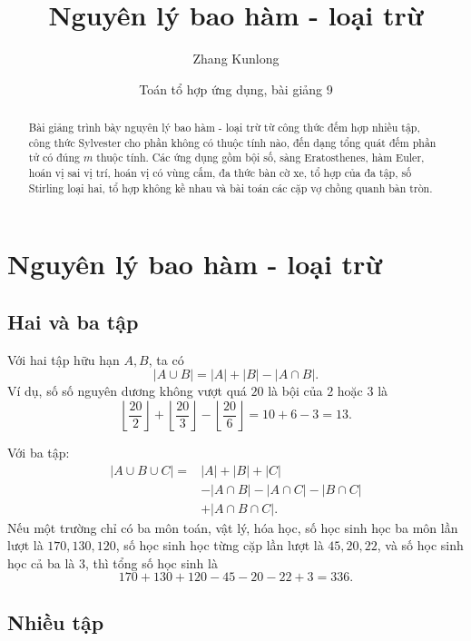 \documentclass[11pt]{article}
\title{Nguyên lý bao hàm - loại trừ}
\author{Zhang Kunlong}
\date{Toán tổ hợp ứng dụng, bài giảng 9}
\newcommand{\card}[1]{\left|#1\right|}
\begin{document}
\maketitle


\begin{abstract}
Bài giảng trình bày nguyên lý bao hàm - loại trừ từ công thức đếm hợp nhiều
tập, công thức Sylvester cho phần không có thuộc tính nào, đến dạng tổng quát
đếm phần tử có đúng \(m\) thuộc tính. Các ứng dụng gồm bội số, sàng
Eratosthenes, hàm Euler, hoán vị sai vị trí, hoán vị có vùng cấm, đa thức bàn
cờ xe, tổ hợp của đa tập, số Stirling loại hai, tổ hợp không kề nhau và bài
toán các cặp vợ chồng quanh bàn tròn.
\end{abstract}

\tableofcontents

\section{Nguyên lý bao hàm - loại trừ}

\subsection{Hai và ba tập}

Với hai tập hữu hạn \(A,B\), ta có
\[
  \card{A\cup B}=\card A+\card B-\card{A\cap B}.
\]
Ví dụ, số số nguyên dương không vượt quá \(20\) là bội của \(2\) hoặc \(3\)
là
\[
  \left\lfloor\frac{20}{2}\right\rfloor+
  \left\lfloor\frac{20}{3}\right\rfloor-
  \left\lfloor\frac{20}{6}\right\rfloor=10+6-3=13.
\]

Với ba tập:
\[
\begin{aligned}
  \card{A\cup B\cup C}
  ={}&\card A+\card B+\card C\\
  &-\card{A\cap B}-\card{A\cap C}-\card{B\cap C}\\
  &+\card{A\cap B\cap C}.
\end{aligned}
\]
Nếu một trường chỉ có ba môn toán, vật lý, hóa học, số học sinh học ba môn
lần lượt là \(170,130,120\), số học sinh học từng cặp lần lượt là \(45,20,22\),
và số học sinh học cả ba là \(3\), thì tổng số học sinh là
\[
  170+130+120-45-20-22+3=336.
\]

\subsection{Nhiều tập}
\end{document}
